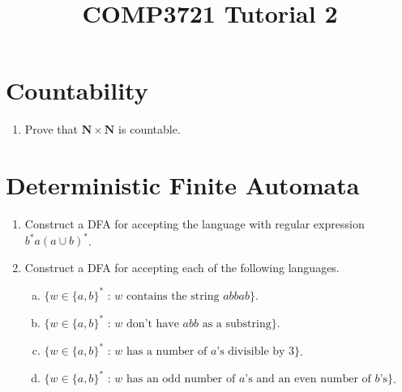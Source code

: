 \documentclass[a4paper]{article}
\date{}
\author{}
\title{COMP3721 Tutorial 2}
\theoremstyle{definition}
\numberwithin{equation}{subsection}
\begin{document}
\maketitle
\section{Countability}
\begin{enumerate}[1.]
\item Prove that $\mathbf{N}\times\mathbf{N}$ is countable.
\end{enumerate}
\section{Deterministic Finite Automata}
\begin{enumerate}[1.]
\item Construct a DFA for accepting the language with regular expression $b^*a(a\cup b)^*$.
\item Construct a DFA for accepting each of the following languages.
\begin{enumerate}[(a)]
\item $\{\textrm{$w\in \{a,b\}^*$ : $w$ contains the string $abbab$}\}$.
\item $\{\textrm{$w\in \{a,b\}^*$ : $w$ don't have $abb$ as a substring}\}$.
\item $\{\textrm{$w\in \{a,b\}^*$ : $w$ has a number of $a$'s divisible by 3}\}$.
\item $\{\textrm{$w\in \{a,b\}^*$ : $w$ has an odd number of $a$'s and an even number of $b$'s}\}$.
\end{enumerate}
\end{enumerate}
\end{document}
